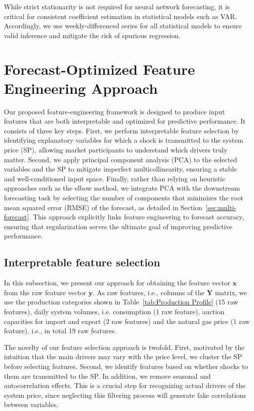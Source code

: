 \documentclass{article}
\begin{document}
While strict stationarity is not required for neural network forecasting, it is critical for consistent coefficient estimation in statistical models such as VAR. Accordingly, we use weekly-differenced series for all statistical models to ensure valid inference and mitigate the risk of spurious regression.


\section{Forecast-Optimized Feature Engineering Approach}
\label{sec:Section IV}
Our proposed feature-engineering framework is designed to produce input features that are both interpretable and optimized for predictive performance. It consists of three key steps. First, we perform interpretable feature selection by identifying explanatory variables for which a shock is transmitted to the system price (SP), allowing market participants to understand which drivers truly matter. Second, we apply principal component analysis (PCA) to the selected variables and the SP to mitigate imperfect multicollinearity, ensuring a stable and well-conditioned input space. Finally, rather than relying on heuristic approaches such as the elbow method, we integrate PCA with the downstream forecasting task by selecting the number of components that minimizes the root mean squared error (RMSE) of the forecast, as detailed in Section~\ref{sec:multi-forecast}. This approach explicitly links feature engineering to forecast accuracy, ensuring that regularization serves the ultimate goal of improving predictive performance.

\subsection{Interpretable feature selection}
\label{subsec:Interpretable feature engineering}
In this subsection, we present our approach for obtaining the feature vector $\textbf{x}$ from the raw feature vector $\textbf{y}$. As raw features, i.e., columns of the $\textbf{Y}$ matrix, we use the production categories shown in Table~\ref{tab:Production Profile} (15 raw features), daily system volumes, i.e. consumption (1 raw feature), auction capacities for import and export (2 raw features) and the natural gas price  (1 raw feature), i.e., in total 19 raw features. 

The novelty of our feature selection approach is twofold. First, motivated by the intuition that the main drivers may vary with the price level, we cluster the SP before selecting features. Second, we identify features based on whether shocks to them are transmitted to the SP. In addition, we remove seasonal and autocorrelation effects. This is a crucial step for recognizing actual drivers of the system price, since neglecting this filtering process will generate fake correlations between variables. 
\end{document}
